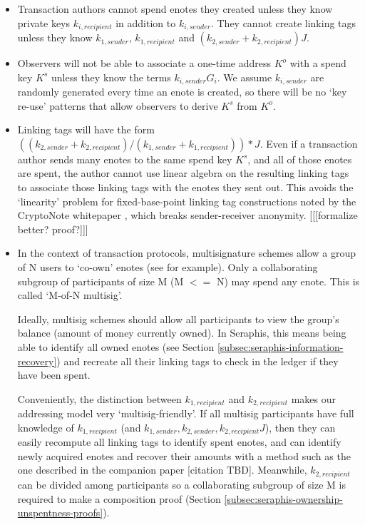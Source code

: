 \begin{itemize}
    \item Transaction authors cannot spend enotes they created unless they know private keys $k_{i, recipient}$ in addition to $k_{i, sender}$. They cannot create linking tags unless they know $k_{1, sender}$, $k_{1, recipient}$ and $(k_{2, sender} + k_{2, recipient}) J$.

    \item Observers will not be able to associate a one-time address $K^o$ with a spend key $K^s$ unless they know the terms $k_{i,sender} G_i$. We assume $k_{i,sender}$ are randomly generated every time an enote is created, so there will be no `key re-use' patterns that allow observers to derive $K^s$ from $K^o$.

    \item Linking tags will have the form $((k_{2, sender} + k_{2, recipient})/(k_{1, sender} + k_{1, recipient}))*J$. Even if a transaction author sends many enotes to the same spend key $K^s$, and all of those enotes are spent, the author cannot use linear algebra on the resulting linking tags to associate those linking tags with the enotes they sent out. This avoids the `linearity' problem for fixed-base-point linking tag constructions noted by the CryptoNote whitepaper \cite{cryptoNoteWhitePaper}, which breaks sender-receiver anonymity. [[[formalize better? proof?]]]

    \item In the context of transaction protocols, multisignature schemes allow a group of N users to `co-own' enotes (see \cite{MRL-0009-multisig} for example). Only a collaborating subgroup of participants of size M (M $<=$ N) may spend any enote. This is called `M-of-N multisig'.

    Ideally, multisig schemes should allow all participants to view the group's balance (amount of money currently owned). In Seraphis, this means being able to identify all owned enotes (see Section \ref{subsec:seraphis-information-recovery}) and recreate all their linking tags to check in the ledger if they have been spent.

    Conveniently, the distinction between $k_{1, recipient}$ and $k_{2, recipient}$ makes our addressing model very `multisig-friendly'. If all multisig participants have full knowledge of $k_{1, recipient}$ (and $k_{1,sender}, k_{2,sender}, k_{2, recipient} J$), then they can easily recompute all linking tags to identify spent enotes, and can identify newly acquired enotes and recover their amounts with a method such as the one described in the companion paper [citation TBD]. Meanwhile, $k_{2, recipient}$ can be divided among participants so a collaborating subgroup of size M is required to make a composition proof (Section \ref{subsec:seraphis-ownership-unspentness-proofs}).


\end{itemize}
